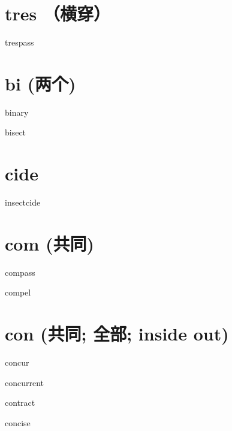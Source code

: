 \section{tres （横穿）}

\begin{wordRef}{trespass}
\end{wordRef}

\section{bi (两个)}

\begin{wordRef}{binary}
\end{wordRef}

\begin{wordRef}{bisect}
\end{wordRef}

\section{cide}

\begin{wordRef}{insectcide}
\end{wordRef}

\section{com (共同)}

\begin{wordRef}{compass}
\end{wordRef}

\begin{wordRef}{compel}
\end{wordRef}

\section{con (共同; 全部; inside out)}
\begin{wordRef}{concur}
\end{wordRef}

\begin{wordRef}{concurrent}
\end{wordRef}

\begin{wordRef}{contract}
\end{wordRef}

\begin{wordRef}{concise}
\end{wordRef}

